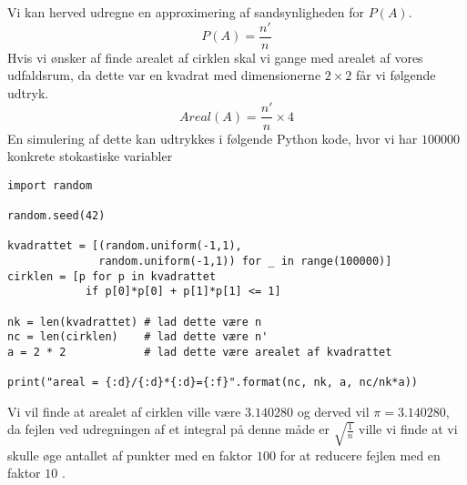 \documentclass[../../SRP.tex]{subfiles}
\begin{document}
Vi kan herved udregne en approximering af sandsynligheden for $P(A)$.
\begin{equation}
  P(A) = \frac{n'}{n}
\end{equation}
Hvis vi ønsker af finde arealet af cirklen skal vi gange med arealet af vores udfaldsrum, da dette var en kvadrat med dimensionerne $2 \times 2$ får vi følgende udtryk.
\begin{equation}
  Areal(A) = \frac{n'}{n} \times 4
\end{equation}
En simulering af dette kan udtrykkes i følgende Python kode, hvor vi har $100000$ konkrete stokastiske variabler \\

\begin{lstlisting}
import random

random.seed(42)

kvadrattet = [(random.uniform(-1,1), 
              random.uniform(-1,1)) for _ in range(100000)]
cirklen = [p for p in kvadrattet
            if p[0]*p[0] + p[1]*p[1] <= 1]

nk = len(kvadrattet) # lad dette være n
nc = len(cirklen)    # lad dette være n'
a = 2 * 2            # lad dette være arealet af kvadrattet

print("areal = {:d}/{:d}*{:d}={:f}".format(nc, nk, a, nc/nk*a))
\end{lstlisting}
Vi vil finde at arealet af cirklen ville være $3.140280$ og derved vil $\pi = 3.140280$, da fejlen ved udregningen af et integral på denne måde er $\sqrt{\frac{1}{n}}$ ville vi finde at vi skulle øge antallet af punkter med en faktor $100$ for at reducere fejlen med en faktor $10$ \cite{SBM}. \\
\end{document}
